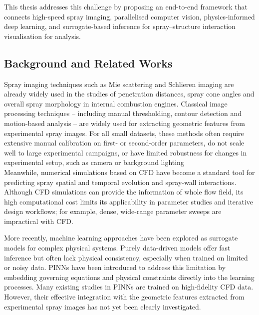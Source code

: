 \documentclass[english, 12pt, a4paper, elec, utf8, a-2b, online]{aaltothesis}
\begin{document}
This thesis addresses this challenge by proposing an end-to-end framework that connects high-speed spray imaging, parallelised computer vision, physics-informed deep learning, and surrogate-based inference for spray–structure interaction visualisation for analysis.



\subsection{Background and Related Works}

Spray imaging techniques such as Mie scattering and Schlieren imaging are already widely used in the studies of penetration distances, spray cone angles and overall spray morphology in internal combustion engines. Classical image processing techniques – including manual thresholding, contour detection and motion-based analysis – are widely used for extracting geometric features from experimental spray images. For all small datasets, these methods often require extensive manual calibration on first- or second-order parameters, do not scale well to large experimental campaigns, or have limited robustness for changes in experimental setup, such as camera or background lighting\\

Meanwhile, numerical simulations based on CFD have become a standard tool for predicting spray spatial and temporal evolution and spray-wall interactions. Although CFD simulations can provide the information of whole flow field, its high computational cost limits its applicability in parameter studies and iterative design workflows; for example, dense, wide-range parameter sweeps are impractical with CFD.

More recently, machine learning approaches have been explored as surrogate models for complex physical systems. Purely data-driven models offer fast inference but often lack physical consistency, especially when trained on limited or noisy data. PINNs have been introduced to address this limitation by embedding governing equations and physical constraints directly into the learning processes. Many existing studies in PINNs are trained on high-fidelity CFD data. However, their effective integration with the geometric features extracted from experimental spray images has not yet been clearly investigated. \\


\end{document}
